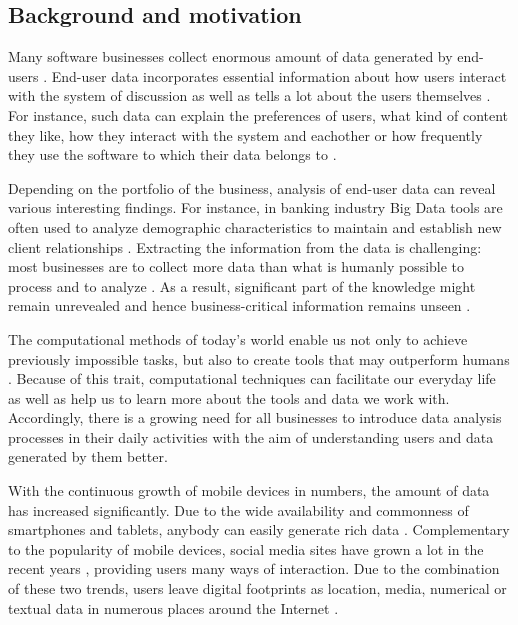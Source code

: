 \subsection{Background and motivation}
    Many software businesses collect enormous amount of data generated by end-users \cite{chinesemobilebankingusers, bigdatamanagementrevolution, inmon2007tapping}. End-user data incorporates essential information about how users interact with the system of discussion as well as tells a lot about the users themselves \cite{jang2015noreciprocity, hu2014we, jang2016teensengagemorewithfewerphotos, han2016teensarefrommars, socialdiversityongithub}. For instance, such data can explain the preferences of users, what kind of content they like, how they interact with the system and eachother or how frequently they use the software to which their data belongs to \cite{youyou2015computer, ottoni2013ladies}.

    Depending on the portfolio of the business, analysis of end-user data can reveal various interesting findings. For instance, in banking industry Big Data tools are often used to analyze demographic characteristics to maintain and establish new client relationships \cite{chinesemobilebankingusers, bigdatamanagementrevolution}. Extracting the information from the data is challenging: most businesses are to collect more data than what is humanly possible to process and to analyze \cite{inmon2007tapping, wegener2010integrating}. As a result, significant part of the knowledge might remain unrevealed and hence business-critical information remains unseen \cite{chinesemobilebankingusers, inmon2007tapping, wegener2010integrating, introtodatamining}. 
    
    The computational methods of today's world enable us not only to achieve previously impossible tasks, but also to create tools that may outperform humans \cite{youyou2015computer}. Because of this trait, computational techniques can facilitate our everyday life as well as help us to learn more about the tools and data we work with. Accordingly, there is a growing need for all businesses to introduce data analysis processes in their daily activities with the aim of understanding users and data generated by them better.

    With the continuous growth of mobile devices in numbers, the amount of data has increased significantly. Due to the wide availability and commonness of smartphones and tablets, anybody can easily generate rich data \cite{jang2016teensengagemorewithfewerphotos}. Complementary to the popularity of mobile devices, social media sites have grown a lot in the recent years \cite{hu2014we, ottoni2013ladies, bakhshi2014faces}, providing users many ways of interaction. Due to the combination of these two trends, users leave digital footprints as location, media, numerical or textual data in numerous places around the Internet \cite{youyou2015computer}. 
    
